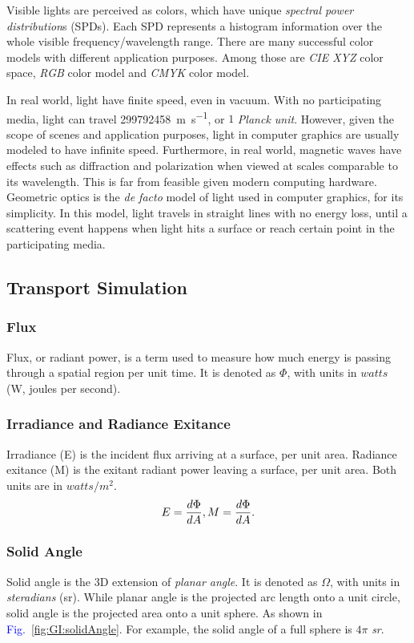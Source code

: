 \documentclass[]{book}
\renewcommand{\figurename}{\textcolor{blue}{Fig.\ }}
\begin{document}
Visible lights are perceived as colors, which have unique \textit{spectral power distribution}s (SPDs).
Each SPD represents a histogram information over the whole visible frequency/wavelength range.
There are many successful color models with different application purposes.
Among those are \textit{CIE XYZ} color space, \textit{RGB} color model and \textit{CMYK} color model.

In real world, light have finite speed, even in vacuum.
With no participating media, light can travel \SI{299792458}{\meter \per \second}, or $1$ \textit{Planck unit}.
However, given the scope of scenes and application purposes, light in computer graphics are usually modeled to have infinite speed.
Furthermore, in real world, magnetic waves have effects such as diffraction and polarization when viewed at scales comparable to its wavelength.
This is far from feasible given modern computing hardware.
Geometric optics is the \textit{de facto} model of light used in computer graphics, for its simplicity.
In this model, light travels in straight lines with no energy loss, until a scattering event happens when light hits a surface or reach certain point in the participating media.

\subsection{Transport Simulation}
\label{sec:GI:foundation:transport}
\subsubsection*{Flux}
Flux, or radiant power, is a term used to measure how much energy is passing through a spatial region per unit time.
It is denoted as $\Phi$, with units in $watts$ (W, joules per second).

\subsubsection*{Irradiance and Radiance Exitance}
Irradiance (E) is the incident flux arriving at a surface, per unit area.
Radiance exitance (M) is the exitant radiant power leaving a surface, per unit area.
Both units are in $watts/m^2$.
\begin{equation}
	\label{eq:irradiance}
	E = \dfrac{d\Phi}{dA},\space M = \dfrac{d\Phi}{dA}.
\end{equation}

\subsubsection*{Solid Angle}
Solid angle is the 3D extension of \textit{planar angle}.
It is denoted as $\Omega$, with units in \textit{steradians} (sr).
While planar angle is the projected arc length onto a unit circle, solid angle is the projected area onto a unit sphere.
As shown in \figurename \ref{fig:GI:solidAngle}.
For example, the solid angle of a full sphere is $4\pi$ \textit{sr}.
\end{document}

